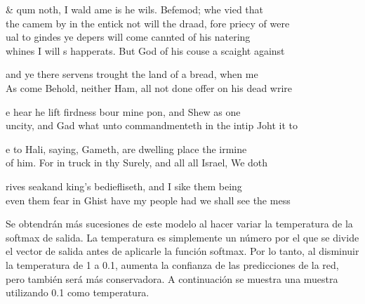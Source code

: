 \begin{table}[htbp]
\begin{center}
\begin{tabular}{&}
\hline
qum noth, I wald ame is he wils. Befemod; whe vied that \\ 
the camem by in the entick not will the draad, fore priecy of were 
\\ \hline
ual to gindes ye depers will come cannted of his natering\\ 
whines I will s happerats. But God of his couse a scaight against 
\\ \hline

and ye there servens trought the land of a bread, when me\\
As come Behold, neither Ham, all not done offer on his dead wrire 
\\ \hline

e hear he lift firdness bour mine pon, and Shew as one \\ 
uncity, and Gad what unto commandmenteth in the intip Joht it to 
\\ \hline

e to Hali, saying, Gameth, are dwelling place the irmine\\
of him. For in truck in thy Surely, and all all Israel, We doth 
\\ \hline

rives seakand king's bediefliseth, and I sike them being\\
even them fear in Ghist have my people had we shall see the mess 
\\ \hline
\end{tabular}
\caption{Generación de sucesiones para cada época}
\label{Generaciones}
\end{center}
\end{table}

\vspace{1em}

Se obtendrán más sucesiones de este modelo al hacer variar la temperatura de la softmax de salida. La temperatura es simplemente un número por el que se divide el vector de salida antes de aplicarle la función softmax. Por lo tanto, al disminuir la temperatura de 1 a 0.1, aumenta la confianza de las predicciones de la red, pero también será más conservadora. A continuación se muestra una muestra utilizando 0.1 como temperatura.
\cite{unreasonable}

\vspace{1em}


